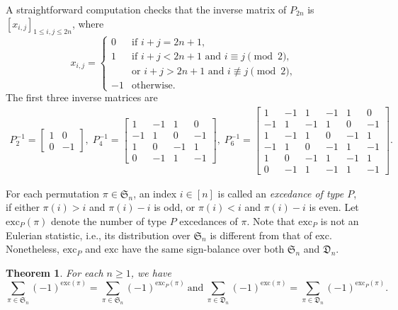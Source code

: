 \documentclass[11pt,reqno]{amsart}
\numberwithin{equation}{section}
\theoremstyle{plain}
\newtheorem{theorem}{Theorem}[section]
\theoremstyle{definition}
\renewcommand{\S}{\mathfrak{S}}
\def\exc{\mathrm{exc}}
\newcommand{\D}{\mathfrak{D}}
\def\t{\text}
\begin{document}
A straightforward computation checks that the inverse matrix of $P_{2n}$ is $[x_{i,j}]_{1\le i,j \le 2n}$, where
$$x_{i,j}=\begin{cases}
0 & \text{if $i+j=2n+1$},\\
1 & \text{if $i+j<2n+1$ and $i\equiv j \pmod 2$,}\\
& \text{or $i+j>2n+1$ and $i\not\equiv j \pmod 2$},\\
-1 & \text{otherwise}.
\end{cases}$$
 The first three inverse matrices are
\begin{align*}
P^{-1}_2=\begin{bmatrix}
1 & 0 \\
0 & -1
\end{bmatrix},
\;
P^{-1}_4=\begin{bmatrix}
1 & -1 & 1 & 0\\
-1 & 1 & 0 & -1\\
1 & 0 & -1 & 1\\
0 & -1 & 1 & -1
\end{bmatrix},
\;
P^{-1}_6=\begin{bmatrix}
1 & -1 & 1 & -1 & 1 & 0\\
-1 & 1 & -1 & 1 & 0 & -1\\
1 & -1 & 1 & 0 & -1 & 1\\
-1 & 1 & 0 & -1 & 1 & -1\\
1 & 0 & -1 & 1 & -1 & 1\\
0 & -1 & 1 & -1 & 1 & -1
\end{bmatrix}.
\end{align*}

For each permutation $\pi\in\S_n$, an index $i\in [n]$ is called an {\it excedance of type $P$}, if either $\pi(i)>i$ and $\pi(i)-i$ is odd, or $\pi(i)<i$ and $\pi(i)-i$ is even. Let $\exc_P(\pi)$ denote the number of type $P$ excedances of $\pi$. Note that $\exc_P$ is not an Eulerian statistic, i.e., its distribution over $\S_n$ is different from that of $\exc$. Nonetheless, $\exc_P$ and $\exc$ have the same sign-balance over both $\S_n$ and $\D_n$.

\begin{theorem}
For each $n\ge 1$, we have
\begin{equation}\label{id:exc=excP over der}
\sum_{\pi\in\S_n}(-1)^{\exc(\pi)} = \sum_{\pi\in\S_n}(-1)^{\exc_P(\pi)}
\ \t{and}\ \sum_{\pi\in\D_n}(-1)^{\exc(\pi)} = \sum_{\pi\in\D_n}(-1)^{\exc_P(\pi)}.
\end{equation}
\end{theorem}
\end{document}
